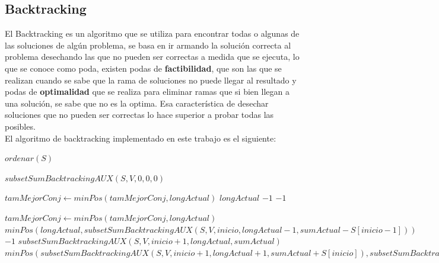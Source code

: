 \documentclass[a4paper]{article}
\begin{document}
\subsection{Backtracking}
El Backtracking es un algoritmo que se utiliza para encontrar todas o algunas de las soluciones de alg\'un problema, se basa en ir armando la soluci\'on correcta al problema desechando las que no pueden ser correctas a medida que se ejecuta, lo que se conoce como poda, existen podas de \textbf{factibilidad}, que son las que se realizan cuando se sabe que la rama de soluciones no puede llegar al resultado y podas de \textbf{optimalidad} que se realiza para eliminar ramas que si bien llegan a una solución, se sabe que no es la optima.
Esa característica de desechar soluciones que no pueden ser correctas lo hace superior a probar todas las posibles.
\\
El algoritmo de backtracking implementado en este trabajo es el siguiente:

\begin{algorithm}
\begin{algorithmic}
		\State $ordenar(S)$ 
		
		\State \Return $subsetSumBacktrackingAUX(S, V, 0, 0, 0)$
	\EndProcedure
\end{algorithmic}
\end{algorithm}

\begin{algorithm}
\begin{algorithmic}
				\State $tamMejorConj \gets minPos(tamMejorConj, longActual)$
				\State \Return $longActual$
			\Else
				\State \Return $-1$
			\EndIf
		\Else
				\State \Return $-1$
			\EndIf
			
				\State $tamMejorConj \gets minPos(tamMejorConj, longActual)$
				\State \Return $minPos(longActual,subsetSumBacktrackingAUX(S,V,inicio,longActual-1,sumActual-S[inicio-1]))$
				\State \Return $-1$
				\State \Return $subsetSumBacktrackingAUX(S, V, inicio + 1, longActual, sumActual)$
			\Else
				\State \Return $minPos(subsetSumBacktrackingAUX(S,V,inicio+1, longActual+1, sumActual + S[inicio]), subsetSumBacktrackingAUX(S,V,inicio+1, longActual, sumActual))$
			\EndIf
		\EndIf
	\EndProcedure
\end{algorithmic}
\end{algorithm}
\end{document}

